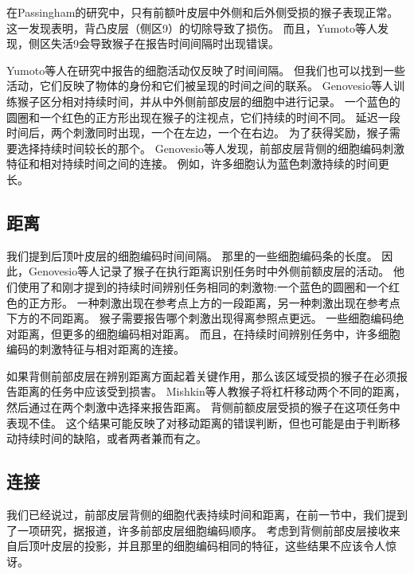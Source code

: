 在Passingham\cite{passingham1978information}的研究中，只有前额叶皮层中外侧和后外侧受损的猴子表现正常。
这一发现表明，背凸皮层（侧区9）的切除导致了损伤。
而且，Yumoto等人\cite{yumoto2011neural}发现，侧区失活9会导致猴子在报告时间间隔时出现错误。


Yumoto等人在研究中报告的细胞活动仅反映了时间间隔。
但我们也可以找到一些活动，它们反映了物体的身份和它们被呈现的时间之间的联系。
Genovesio等人\cite{genovesio2009feature}训练猴子区分相对持续时间，并从中外侧前部皮层的细胞中进行记录。
一个蓝色的圆圈和一个红色的正方形出现在猴子的注视点，它们持续的时间不同。
延迟一段时间后，两个刺激同时出现，一个在左边，一个在右边。
为了获得奖励，猴子需要选择持续时间较长的那个。
Genovesio等人发现，前部皮层背侧的细胞编码刺激特征和相对持续时间之间的连接。
例如，许多细胞认为蓝色刺激持续的时间更长。


\subsection{距离}

我们提到后顶叶皮层的细胞编码时间间隔\cite{leon2003representation}。
那里的一些细胞编码条的长度\cite{tudusciuc2007neuronal}。
因此，Genovesio等人\cite{genovesio2011prefrontal}记录了猴子在执行距离识别任务时中外侧前额皮层的活动。
他们使用了和刚才提到的持续时间辨别任务相同的刺激物:一个蓝色的圆圈和一个红色的正方形。
一种刺激出现在参考点上方的一段距离，另一种刺激出现在参考点下方的不同距离。
猴子需要报告哪个刺激出现得离参照点更远。
一些细胞编码绝对距离，但更多的细胞编码相对距离。
而且，在持续时间辨别任务中，许多细胞编码的刺激特征与相对距离的连接。


如果背侧前部皮层在辨别距离方面起着关键作用，那么该区域受损的猴子在必须报告距离的任务中应该受到损害。
Mishkin等人\cite{mishkin1977kinesthetic}教猴子将杠杆移动两个不同的距离，然后通过在两个刺激中选择来报告距离。
背侧前额皮层受损的猴子在这项任务中表现不佳。
这个结果可能反映了对移动距离的错误判断，但也可能是由于判断移动持续时间的缺陷，或者两者兼而有之。



\subsection{连接}

我们已经说过，前部皮层背侧的细胞代表持续时间和距离，在前一节中，我们提到了一项研究，据报道，许多前部皮层细胞编码顺序\cite{ninokura2003representation,genovesio2009feature}。
考虑到背侧前部皮层接收来自后顶叶皮层的投影，并且那里的细胞编码相同的特征，这些结果不应该令人惊讶\cite{tudusciuc2007neuronal,bueti2009parietal}。


